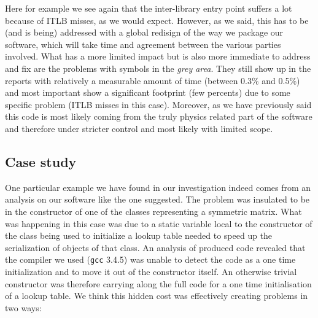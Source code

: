 \documentclass[a4paper]{jpconf}
\begin{document}
\begin{figure}
\caption{}
\label{}
\begin{center}
\end{center}
\end{figure}



Here for example we see again that the inter-library entry point suffers a lot because of ITLB misses, as we would expect. However, as we said, this has to be (and is being) addressed with a global redisign of the way we package our software, which will take time and agreement between the various parties involved.
What has a more limited impact but is also more immediate to address and fix are the problems with symbols in the {\itshape grey area}. They still show up in the reports with relatively a measurable amount of time (between 0.3\% and 0.5\%) and most important show a significant footprint (few percents) due to some specific problem (ITLB misses in this case). Moreover, as we have previously said this code is most likely coming from the truly physics related part of the software and therefore under stricter control and most likely with limited scope.


\subsection{Case study}
\label{casestudy}

One particular example we have found in our investigation indeed comes from an analysis on our software like the one suggested. The problem was insulated to be in the constructor of one of the classes representing a symmetric matrix. What was happening in this case was due to a static variable local to the constructor of the class being used to initialize a lookup table needed to speed up the serialization of objects of that class. An analysis of produced code revealed that the compiler we used (\texttt{gcc} 3.4.5) was unable to detect the code as a one time initialization and to move it out of the constructor itself. An otherwise trivial constructor was therefore carrying along the full code for a one time initialisation of a lookup table. We think this hidden cost was effectively creating problems in two ways:
\end{document}
